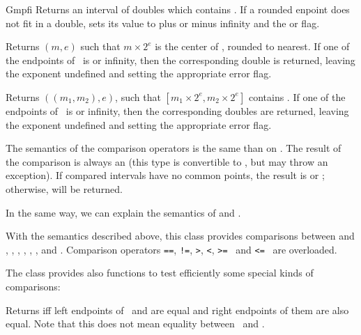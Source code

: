 \begin{ccRefClass} {Gmpfi}
        {Returns an interval of doubles which contains \ccVar. If a
        rounded enpoint does not fit in a double, sets its value to plus
        or minus infinity and the  or  flag.}

        {Returns \((m,e)\) such that \(m \times 2^e\) is the center of
        \ccVar, rounded to nearest. If one of the endpoints of \ccVar~is
         or infinity, then the corresponding double is returned,
        leaving the exponent undefined and setting the appropriate
        error flag.}

        {Returns \(((m_1,m_2),e)\), such that \([m_1 \times 2^e,m_2
        \times 2^e]\) contains \ccVar . If one of the endpoints of
        \ccVar~is  or infinity, then the corresponding doubles
        are returned, leaving the exponent undefined and setting the
        appropriate error flag.}



The semantics of the comparison operators is the same than
on .  The result of the comparison
is always an  (this type is convertible to
, but may throw an exception).  If compared intervals have
no common points, the result is  or ; otherwise,
 will be returned.

In the same way, we can explain the semantics of
 and .

With the semantics described above, this class provides comparisons between
 and , , ,
, , , 
and . Comparison operators \verb-==-, \verb-!=-, \verb->-,
\verb-<-, \verb->=- \ and \verb-<=- \ are overloaded.

The class provides also functions to test efficiently some special kinds
of comparisons:

        {Returns  iff left endpoints of \ccVar~and
         are equal and right endpoints of them are also equal. Note
        that this does not mean equality between \ccVar~and .}


\end{ccRefClass}

